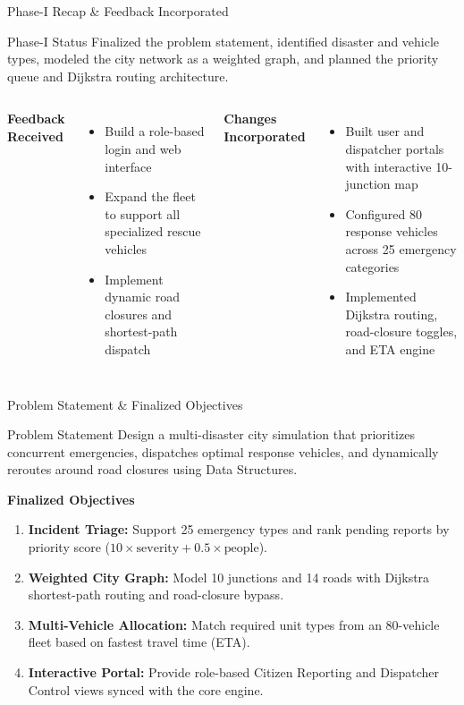 \documentclass[aspectratio=169,11pt]{beamer}
\begin{document}
\begin{frame}{Phase-I Recap \& Feedback Incorporated}
\begin{block}{Phase-I Status}
\small
Finalized the problem statement, identified disaster and vehicle types, modeled the city network as a weighted graph, and planned the priority queue and Dijkstra routing architecture.
\end{block}
\vspace{2mm}
\footnotesize
\begin{columns}[T,totalwidth=\textwidth]
\textbf{\normalsize\color{GEUBlue}Feedback Received}
\begin{itemize}\itemsep2pt
\item Build a role-based login and web interface
\item Expand the fleet to support all specialized rescue vehicles
\item Implement dynamic road closures and shortest-path dispatch
\end{itemize}
\textbf{\normalsize\color{GEUBlue}Changes Incorporated}
\begin{itemize}\itemsep2pt
\item Built user and dispatcher portals with interactive 10-junction map
\item Configured 80 response vehicles across 25 emergency categories
\item Implemented Dijkstra routing, road-closure toggles, and ETA engine
\end{itemize}
\end{columns}
\end{frame}

\begin{frame}{Problem Statement \& Finalized Objectives}
\begin{block}{Problem Statement}
\small
Design a multi-disaster city simulation that prioritizes concurrent emergencies, dispatches optimal response vehicles, and dynamically reroutes around road closures using Data Structures.
\end{block}
\vspace{1.5mm}
\footnotesize
\textbf{\normalsize\color{GEUBlue}Finalized Objectives}
\begin{enumerate}\itemsep1.5pt
\item \textbf{Incident Triage:} Support 25 emergency types and rank pending reports by priority score ($10 \times \text{severity} + 0.5 \times \text{people}$).
\item \textbf{Weighted City Graph:} Model 10 junctions and 14 roads with Dijkstra shortest-path routing and road-closure bypass.
\item \textbf{Multi-Vehicle Allocation:} Match required unit types from an 80-vehicle fleet based on fastest travel time (ETA).
\item \textbf{Interactive Portal:} Provide role-based Citizen Reporting and Dispatcher Control views synced with the core engine.
\end{enumerate}
\end{frame}
\end{document}
